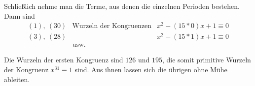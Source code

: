 Schließlich nehme man die Terme, aus denen die einzelnen Perioden bestehen. Dann sind
\[
\begin{array}{lll}
(1),\ (30)&\text{Wurzeln der Kongruenzen}&x^2-(15\ast0)x+1\equiv0\\
(3),\ (28)&&x^2-(15\ast1)x+1\equiv0\\
&\text{usw.}
\end{array}
\]

Die Wurzeln der ersten Kongruenz sind $126$ und $195$, die somit primitive Wurzeln der Kongruenz $x^{31}\equiv1$ sind. Aus ihnen lassen sich die übrigen ohne Mühe ableiten.
